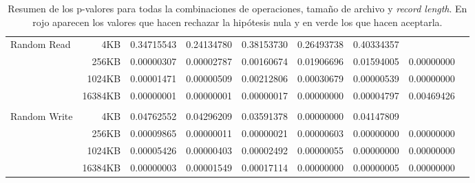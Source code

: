 \begin{table}[!htp]
\begin{tabular}{lrrrrrrrr}
\multirow{4}{*}{Random Read} &4KB &\cellcolor[HTML]{b7e1cd}0.34715543 &\cellcolor[HTML]{b7e1cd}0.24134780 &\cellcolor[HTML]{b7e1cd}0.38153730 &\cellcolor[HTML]{b7e1cd}0.26493738 &\cellcolor[HTML]{b7e1cd}0.40334357 & \\
&256KB &\cellcolor[HTML]{f4c7c3}0.00000307 &\cellcolor[HTML]{f4c7c3}0.00002787 &\cellcolor[HTML]{f4c7c3}0.00160674 &\cellcolor[HTML]{f4c7c3}0.01906696 &\cellcolor[HTML]{f4c7c3}0.01594005 &\cellcolor[HTML]{f4c7c3}0.00000000 \\
&1024KB &\cellcolor[HTML]{f4c7c3}0.00001471 &\cellcolor[HTML]{f4c7c3}0.00000509 &\cellcolor[HTML]{f4c7c3}0.00212806 &\cellcolor[HTML]{f4c7c3}0.00030679 &\cellcolor[HTML]{f4c7c3}0.00000539 &\cellcolor[HTML]{f4c7c3}0.00000000 \\
&16384KB &\cellcolor[HTML]{f4c7c3}0.00000001 &\cellcolor[HTML]{f4c7c3}0.00000001 &\cellcolor[HTML]{f4c7c3}0.00000017 &\cellcolor[HTML]{f4c7c3}0.00000000 &\cellcolor[HTML]{f4c7c3}0.00004797 &\cellcolor[HTML]{f4c7c3}0.00469426 \\
& & & & & & & \\
\multirow{4}{*}{Random Write} &4KB &\cellcolor[HTML]{f4c7c3}0.04762552 &\cellcolor[HTML]{f4c7c3}0.04296209 &\cellcolor[HTML]{f4c7c3}0.03591378 &\cellcolor[HTML]{f4c7c3}0.00000000 &\cellcolor[HTML]{f4c7c3}0.04147809 & \\
&256KB &\cellcolor[HTML]{f4c7c3}0.00009865 &\cellcolor[HTML]{f4c7c3}0.00000011 &\cellcolor[HTML]{f4c7c3}0.00000021 &\cellcolor[HTML]{f4c7c3}0.00000603 &\cellcolor[HTML]{f4c7c3}0.00000000 &\cellcolor[HTML]{f4c7c3}0.00000000 \\
&1024KB &\cellcolor[HTML]{f4c7c3}0.00005426 &\cellcolor[HTML]{f4c7c3}0.00000403 &\cellcolor[HTML]{f4c7c3}0.00002492 &\cellcolor[HTML]{f4c7c3}0.00000055 &\cellcolor[HTML]{f4c7c3}0.00000000 &\cellcolor[HTML]{f4c7c3}0.00000000 \\
&16384KB &\cellcolor[HTML]{f4c7c3}0.00000003 &\cellcolor[HTML]{f4c7c3}0.00001549 &\cellcolor[HTML]{f4c7c3}0.00017114 &\cellcolor[HTML]{f4c7c3}0.00000000 &\cellcolor[HTML]{f4c7c3}0.00000005 &\cellcolor[HTML]{f4c7c3}0.00000000 \\
\bottomrule
\end{tabular}
\caption{Resumen de los p-valores para todas la combinaciones de operaciones, tamaño de archivo y \textit{record length}. En rojo aparecen los valores que hacen rechazar la hipótesis nula y en verde los que hacen aceptarla.}
\end{table}

